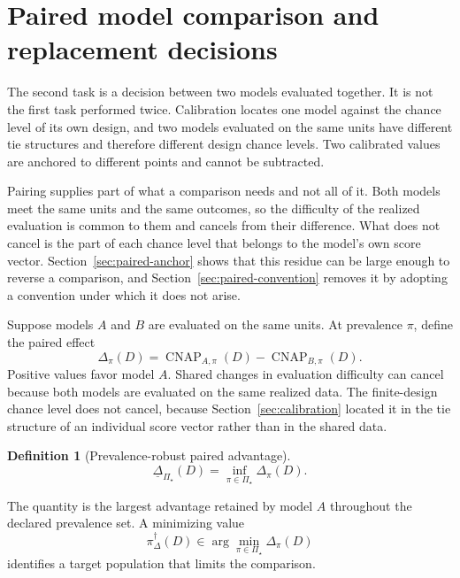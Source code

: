 \documentclass[11pt]{article}
\newcommand{\CNAP}{\operatorname{CNAP}}
\newcommand{\PSet}{\Pi_\star}
\newcommand{\RobDelta}{\underline{\Delta}_{\PSet}}
\newtheorem{definition}{Definition}
\theoremstyle{remark}
\begin{document}
\section{Paired model comparison and replacement decisions}
\label{sec:paired}

The second task is a decision between two models evaluated together. It is not the first task performed twice. Calibration locates one model against the chance level of its own design, and two models evaluated on the same units have different tie structures and therefore different design chance levels. Two calibrated values are anchored to different points and cannot be subtracted.

Pairing supplies part of what a comparison needs and not all of it. Both models meet the same units and the same outcomes, so the difficulty of the realized evaluation is common to them and cancels from their difference. What does not cancel is the part of each chance level that belongs to the model's own score vector. Section~\ref{sec:paired-anchor} shows that this residue can be large enough to reverse a comparison, and Section~\ref{sec:paired-convention} removes it by adopting a convention under which it does not arise.

Suppose models $A$ and $B$ are evaluated on the same units. At prevalence $\pi$, define the paired effect
\begin{equation}
\Delta_\pi(D)
=
\CNAP_{A,\pi}(D)
-
\CNAP_{B,\pi}(D).
\label{eq:paired-effect}
\end{equation}
Positive values favor model $A$. Shared changes in evaluation difficulty can cancel because both models are evaluated on the same realized data. The finite-design chance level does not cancel, because Section~\ref{sec:calibration} located it in the tie structure of an individual score vector rather than in the shared data.

\begin{definition}[Prevalence-robust paired advantage]
\begin{equation}
\RobDelta(D)
=
\inf_{\pi\in\PSet}
\Delta_\pi(D).
\label{eq:robust-paired-effect}
\end{equation}
\end{definition}

The quantity is the largest advantage retained by model $A$ throughout the declared prevalence set. A minimizing value
\[
\pi_\Delta^\dagger(D)
\in
\arg\min_{\pi\in\PSet}\Delta_\pi(D)
\]
identifies a target population that limits the comparison.
\end{document}
